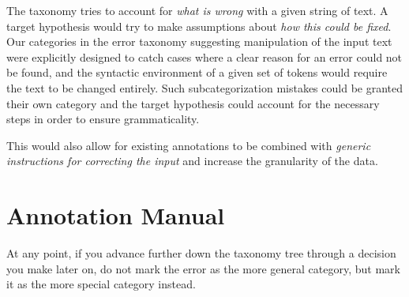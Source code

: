 \documentclass[12pt]{article}
\begin{document}
The taxonomy tries to account for \textit{what is wrong} with a given string of
text. A target hypothesis would try to make assumptions about \textit{how this
could be fixed}. Our categories in the error taxonomy suggesting manipulation of
the input text were explicitly designed to catch cases where a clear reason for
an error could not be found, and the syntactic environment of a given set of
tokens would require the text to be changed entirely. Such subcategorization
mistakes could be granted their own category and the target hypothesis could
account for the necessary steps in order to ensure grammaticality.

This would also allow for existing annotations to be combined with
\textit{generic instructions for correcting the input} and increase the
granularity of the data.

\appendix

\section{Annotation Manual}
  At any point, if you advance further down the taxonomy tree through a decision
  you make later on, do not mark the error as the more general category, but
  mark it as the more special category instead.
\end{document}
